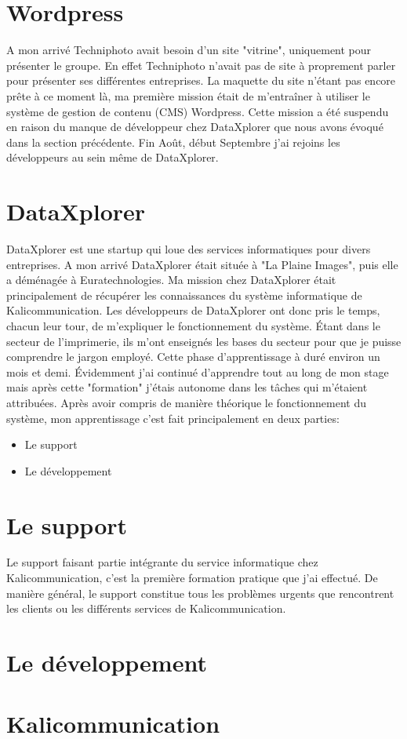 
\section{Wordpress}
A mon arrivé Techniphoto avait besoin d'un site "vitrine", uniquement pour présenter le groupe. En effet Techniphoto n'avait pas de site à proprement parler pour présenter ses différentes entreprises. La maquette du site n'étant pas encore prête à ce moment là, ma première mission était de m'entraîner à utiliser le système de gestion de contenu (CMS) Wordpress. Cette mission a été suspendu en raison du manque de développeur chez DataXplorer que nous avons évoqué dans la section précédente. Fin Août, début Septembre j'ai rejoins les développeurs au sein même de DataXplorer.

\section{DataXplorer}
DataXplorer est une startup qui loue des services informatiques pour divers entreprises. A mon arrivé DataXplorer était située à "La Plaine Images", puis elle a déménagée à Euratechnologies. Ma mission chez DataXplorer était principalement de récupérer les connaissances du système informatique de Kalicommunication. Les développeurs de DataXplorer ont donc pris le temps, chacun leur tour, de m'expliquer le fonctionnement du système. Étant dans le secteur de l'imprimerie, ils m'ont enseignés les bases du secteur pour que je puisse comprendre le jargon employé. Cette phase d'apprentissage à duré environ un mois et demi. Évidemment j'ai continué d'apprendre tout au long de mon stage mais après cette "formation" j'étais autonome dans les tâches qui m'étaient attribuées.\newline
Après avoir compris de manière théorique le fonctionnement du système, mon apprentissage c'est fait principalement en deux parties:
\begin{itemize}
\item Le support
\item Le développement
\end{itemize}

\section{Le support}
Le support faisant partie intégrante du service informatique chez Kalicommunication, c'est la première formation pratique que j'ai effectué. De manière général, le support constitue tous les problèmes urgents que rencontrent les clients ou les différents services de Kalicommunication.

\section{Le développement}
\section{Kalicommunication}